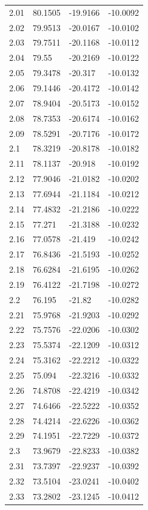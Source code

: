 \begin{tabular}{llll}
2.01 & 80.1505 & -19.9166 & -10.0092 \\
2.02 & 79.9513 & -20.0167 & -10.0102 \\
2.03 & 79.7511 & -20.1168 & -10.0112 \\
2.04 & 79.55 & -20.2169 & -10.0122 \\
2.05 & 79.3478 & -20.317 & -10.0132 \\
2.06 & 79.1446 & -20.4172 & -10.0142 \\
2.07 & 78.9404 & -20.5173 & -10.0152 \\
2.08 & 78.7353 & -20.6174 & -10.0162 \\
2.09 & 78.5291 & -20.7176 & -10.0172 \\
2.1 & 78.3219 & -20.8178 & -10.0182 \\
2.11 & 78.1137 & -20.918 & -10.0192 \\
2.12 & 77.9046 & -21.0182 & -10.0202 \\
2.13 & 77.6944 & -21.1184 & -10.0212 \\
2.14 & 77.4832 & -21.2186 & -10.0222 \\
2.15 & 77.271 & -21.3188 & -10.0232 \\
2.16 & 77.0578 & -21.419 & -10.0242 \\
2.17 & 76.8436 & -21.5193 & -10.0252 \\
2.18 & 76.6284 & -21.6195 & -10.0262 \\
2.19 & 76.4122 & -21.7198 & -10.0272 \\
2.2 & 76.195 & -21.82 & -10.0282 \\
2.21 & 75.9768 & -21.9203 & -10.0292 \\
2.22 & 75.7576 & -22.0206 & -10.0302 \\
2.23 & 75.5374 & -22.1209 & -10.0312 \\
2.24 & 75.3162 & -22.2212 & -10.0322 \\
2.25 & 75.094 & -22.3216 & -10.0332 \\
2.26 & 74.8708 & -22.4219 & -10.0342 \\
2.27 & 74.6466 & -22.5222 & -10.0352 \\
2.28 & 74.4214 & -22.6226 & -10.0362 \\
2.29 & 74.1951 & -22.7229 & -10.0372 \\
2.3 & 73.9679 & -22.8233 & -10.0382 \\
2.31 & 73.7397 & -22.9237 & -10.0392 \\
2.32 & 73.5104 & -23.0241 & -10.0402 \\
2.33 & 73.2802 & -23.1245 & -10.0412 \\

\end{tabular}
